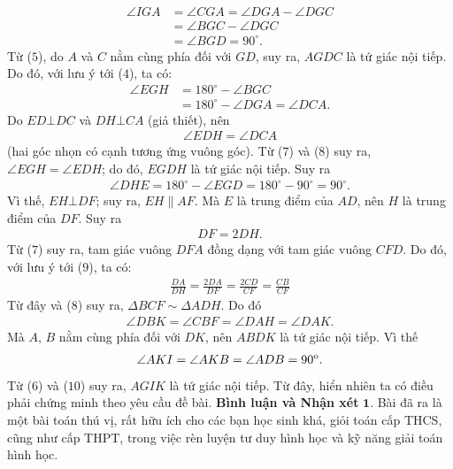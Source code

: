 \begin{multicols}{2}
\begin{align*}
		\angle IGA &= \angle CGA = \angle DGA - \angle DGC \\
		&= \angle BGC - \angle DGC \\
		&= \angle BGD = {90^{\circ}}. \tag{$6$}
	\end{align*}
	Từ ($5$), do $A$ và $C$ nằm cùng phía đối với $GD$, suy ra, $AGDC$ là tứ giác nội tiếp. Do đó, với lưu ý tới ($4$), ta có:
	\begin{align*}
		\angle EGH &= {180^{\circ}} - \angle BGC \\
		&= {180^{\circ}} - \angle DGA = \angle DCA. \tag{$7$}
	\end{align*}
	Do $ED \bot DC$ và $DH \bot CA$ (giả thiết), nên
	\begin{align*}
		\angle EDH = \angle DCA  \tag{$8$}
	\end{align*}
	(hai góc nhọn có cạnh tương ứng vuông góc).
	\vskip 0.05cm
	Từ ($7$) và ($8$) suy ra, $\angle EGH = \angle EDH$; do đó, $EGDH$ là tứ giác nội tiếp. Suy ra
	\begin{align*}
		\angle DHE \!=\!\! {180^{\circ}} \!-\! \angle EGD \!=\! {180^{\circ}} \!\!-\! {90^{\circ}} \!=\! {90^{\circ}}.
	\end{align*}
	Vì thế, $EH \bot DF$; suy ra, $EH \parallel AF$. Mà $E$ là trung điểm của $AD$, nên $H$ là trung điểm của $DF$. Suy ra
	\begin{align*}
		DF = 2DH.                     \tag{$9$}
	\end{align*}
	Từ ($7$) suy ra, tam giác vuông $DFA$ đồng dạng với tam giác vuông $CFD$. Do đó, với lưu ý tới ($9$), ta có:
	\begin{align*}
		\frac{{DA}}{{DH}} = \frac{{2DA}}{{DF}} = \frac{{2CD}}{{CF}} = \frac{{CB}}{{CF}}
	\end{align*}
	Từ đây và ($8$) suy ra, $\Delta BCF \sim \Delta ADH$. Do đó
	\begin{align*}
		\angle DBK = \angle CBF = \angle DAH = \angle DAK.
	\end{align*}
	Mà $A$, $B$ nằm cùng phía đối với $DK$, nên $ABDK$ là tứ giác nội tiếp. Vì thế
	\begin{align*}
		\angle AKI = \angle AKB = \angle ADB = {90^{\rm{o}}}.
	\end{align*}
	Từ ($6$) và ($10$) suy ra, $AGIK$ là tứ giác nội tiếp. Từ đây, hiển nhiên ta có điều phải chứng minh theo yêu cầu đề bài.
	\vskip 0.05cm
	\textbf{\color{thachthuctoanhoc}Bình luận và Nhận xét}
	\vskip 0.05cm
	$\pmb{1.}$ Bài đã ra là một bài toán thú vị, rất hữu ích cho các bạn học sinh khá, giỏi toán cấp THCS, cũng như cấp THPT, trong việc rèn luyện tư duy hình học và kỹ năng giải toán hình học.

\end{multicols}

